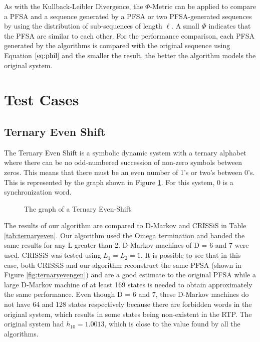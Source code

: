 {As with the Kullback-Leibler Divergence, the $\Phi$-Metric can be applied to compare a PFSA and a sequence generated by a PFSA or two PFSA-generated sequences by using the distribution of sub-sequences of length $\ell$. A small $\Phi$ indicates that the PFSA are similar to each other. For the performance comparison, each PFSA generated by the algorithms is compared with the original sequence using Equation $\ref{eq:phil}$ and the smaller the result, the better the algorithm models the original system.

\section{Test Cases}\label{sec:testcases}

\subsection{Ternary Even Shift}

The Ternary Even Shift is a symbolic dynamic system with a ternary alphabet where there can be no odd-numbered succession of non-zero symbols between zeros. This means that there must be an even number of 1's or two's between 0's. This is represented by the graph shown in Figure \ref{fig:ternaryeven}. For this system, 0 is a synchronization word.

\begin{figure}
\centering
{}
\caption{The graph of a Ternary Even-Shift.\label{fig:ternaryeven}}
\end{figure}

The results of our algorithm are compared to D-Markov and CRISSiS in Table \ref{tab:ternaryeven}. Our algorithm used the Omega termination and handed the same results for any L greater than 2. D-Markov machines of D = 6 and 7 were used. CRISSiS was tested using $L_1 = L_2 = 1$. It is possible to see that in this case, both CRISSiS and our algorithm reconstruct the same PFSA (shown in Figure \ref{fig:ternaryevengen}) and are a good estimate to the original PFSA  while a large D-Markov machine of at least 169 states is needed to obtain approximately the same performance. Even though D = 6 and 7, these D-Markov machines do not have 64 and 128 states respectively because there are forbidden words in the original system, which results in some states being non-existent in the RTP. The original system had $h_{10} = 1.0013$, which is close to the value found by all the algorithms.

}
